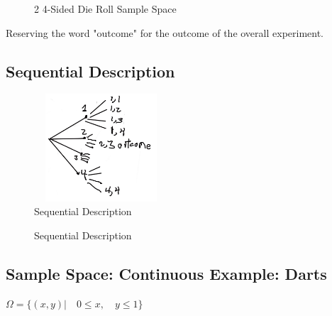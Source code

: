 % 
\begin{figure}[ht]
\centering

\caption{2 4-Sided Die Roll Sample Space}
\end{figure}


Reserving the word "outcome" for the outcome of the overall experiment.

\subsection{Sequential Description}

\begin{figure}[ht]
\centering
\includegraphics[width=5cm, height=4cm]{images/L01/sequential_desc.jpeg}
\caption{Sequential Description}
\end{figure}

\begin{figure}[ht]
\centering

\caption{Sequential Description}
\end{figure}


\subsection{Sample Space: Continuous Example: Darts}

$\Omega = \{(x,y) | \quad 0 \le x, \quad y \le 1 \}$

